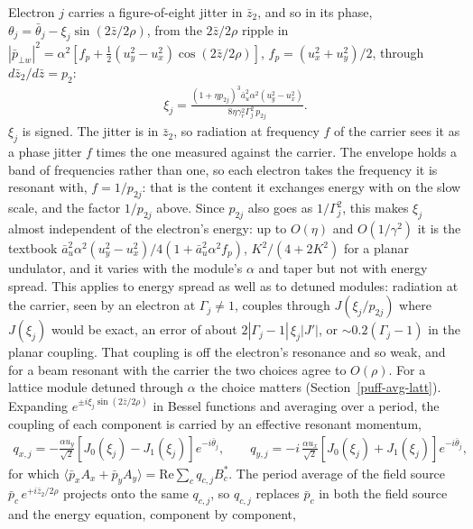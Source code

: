 \documentclass[12pt]{article}%
\begin{document}
Electron $j$ carries a figure-of-eight jitter in $\bar{z}_2$, and so in its phase, $\theta_j = \bar{\theta}_j - \xi_j \sin(2\bar{z}/2\rho)$, from the $2\bar{z}/2\rho$ ripple in $|\bar{p}_{\bot w}|^2 = \alpha^2[f_p + \tfrac12(u_y^2 - u_x^2)\cos(2\bar{z}/2\rho)]$, $f_p = (u_x^2 + u_y^2)/2$, through $d\bar{z}_2/d\bar{z} = p_2$:
\begin{align}
\xi_j = \frac{(1 + \eta p_{2j})^3 \bar{a}_u^2 \alpha^2 (u_y^2 - u_x^2)}{8 \eta \gamma_r^2 \Gamma_j^2\, p_{2j}}.
\end{align}
$\xi_j$ is signed. The jitter is in $\bar{z}_2$, so radiation at frequency $f$ of the carrier sees it as a phase jitter $f$ times the one measured against the carrier. The envelope holds a band of frequencies rather than one, so each electron takes the frequency it is resonant with, $f = 1/p_{2j}$: that is the content it exchanges energy with on the slow scale, and the factor $1/p_{2j}$ above. Since $p_{2j}$ also goes as $1/\Gamma_j^2$, this makes $\xi_j$ almost independent of the electron's energy: up to $O(\eta)$ and $O(1/\gamma^2)$ it is the textbook $\bar{a}_u^2 \alpha^2 (u_y^2 - u_x^2)/4(1 + \bar{a}_u^2 \alpha^2 f_p)$, $K^2/(4 + 2K^2)$ for a planar undulator, and it varies with the module's $\alpha$ and taper but not with energy spread. This applies to energy spread as well as to detuned modules: radiation at the carrier, seen by an electron at $\Gamma_j \neq 1$, couples through $J(\xi_j/p_{2j})$ where $J(\xi_j)$ would be exact, an error of about $2|\Gamma_j - 1|\,\xi_j |J'|$, or $\sim 0.2(\Gamma_j - 1)$ in the planar coupling. That coupling is off the electron's resonance and so weak, and for a beam resonant with the carrier the two choices agree to $O(\rho)$. For a lattice module detuned through $\alpha$ the choice matters (Section~\ref{puff-avg-latt}). Expanding $e^{\pm i\xi_j \sin(2\bar{z}/2\rho)}$ in Bessel functions and averaging over a period, the coupling of each component is carried by an effective resonant momentum,
\begin{align}
q_{x,j} = -\frac{\alpha u_y}{\sqrt{2}} \left[J_0(\xi_j) - J_1(\xi_j)\right] e^{-i\bar{\theta}_j}, \qquad
q_{y,j} = -i\,\frac{\alpha u_x}{\sqrt{2}} \left[J_0(\xi_j) + J_1(\xi_j)\right] e^{-i\bar{\theta}_j},
\end{align}
for which $\langle \bar{p}_x A_x + \bar{p}_y A_y \rangle = \mathrm{Re}\sum_c q_{c,j} B_c^*$. The period average of the field source $\bar{p}_c\, e^{+i\bar{z}_2/2\rho}$ projects onto the same $q_{c,j}$, so $q_{c,j}$ replaces $\bar{p}_c$ in both the field source and the energy equation, component by component,
\end{document}
